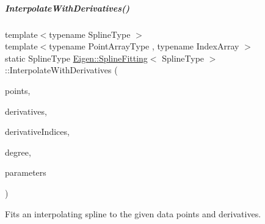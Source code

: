 \mbox{\label{group___splines___module_ac3224187ac93e21e7b04cd499c2a1bcd}} 
\subparagraph{\texorpdfstring{Interpolate\+With\+Derivatives()}{InterpolateWithDerivatives()}\hspace{0.1cm}{\footnotesize\ttfamily [4/4]}}
{\footnotesize\ttfamily template$<$typename Spline\+Type $>$ \\
template$<$typename Point\+Array\+Type , typename Index\+Array $>$ \\
static Spline\+Type \hyperlink{group___splines___module_struct_eigen_1_1_spline_fitting}{Eigen\+::\+Spline\+Fitting}$<$ Spline\+Type $>$\+::Interpolate\+With\+Derivatives (\begin{DoxyParamCaption}\item[{const Point\+Array\+Type \&}]{points,  }\item[{const Point\+Array\+Type \&}]{derivatives,  }\item[{const Index\+Array \&}]{derivative\+Indices,  }\item[{const unsigned int}]{degree,  }\item[{const Parameter\+Vector\+Type \&}]{parameters }\end{DoxyParamCaption})\hspace{0.3cm}{\ttfamily [static]}}



Fits an interpolating spline to the given data points and derivatives. 


